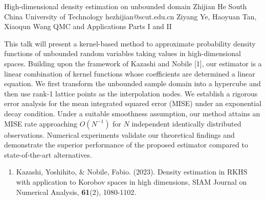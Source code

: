 \begin{talk}
  {High-dimensional density estimation on  unbounded domain}%
  {Zhijian He}%
  {South China University of Technology}%
  {hezhijian@scut.edu.cn}%
  {Ziyang Ye, Haoyuan Tan, Xiaoqun Wang}%
  {QMC and Applications Parts I and II}%
    
   
This talk will present a kernel-based method to approximate probability density functions of unbounded random variables taking values in high-dimensional spaces. Building upon the framework of Kazashi and Nobile [1], our estimator is a linear combination of kernel functions whose coefficients are determined a linear equation. We first transform the unbounded sample domain into a hypercube and then use rank-1 lattice points as the interpolation nodes.
We establish a rigorous error analysis for the mean integrated squared error (MISE) under an exponential decay condition.  Under a suitable smoothness assumption, our method attains an MISE rate  approaching $O(N^{-1})$ for $N$ independent identically distributed observations. Numerical experiments validate our theoretical findings and demonstrate the superior performance of the proposed estimator compared to state-of-the-art alternatives.
\medskip


\begin{enumerate}
 \item[{[1]}] Kazashi, Yoshihito, \& Nobile, Fabio. (2023). Density estimation in {RKHS} with application to Korobov spaces in high dimensions, SIAM Journal on Numerical Analysis, \textbf{61}(2), 1080-1102.
\end{enumerate}

\end{talk}

